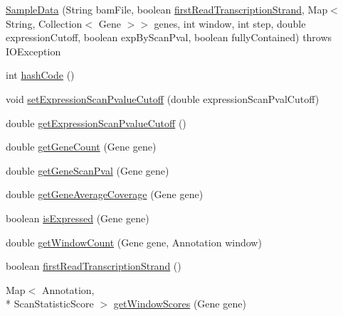 \begin{DoxyCompactItemize}
\item 
\hyperlink{classbroad_1_1pda_1_1seq_1_1protection_1_1_sample_data_acbea9965c1d9f8b120e1510e326c5b96}{Sample\+Data} (String bam\+File, boolean \hyperlink{classbroad_1_1pda_1_1seq_1_1protection_1_1_sample_data_a1a603b2dd39ba9c8b54b3552a3053783}{first\+Read\+Transcription\+Strand}, Map$<$ String, Collection$<$ Gene $>$$>$ genes, int window, int step, double expression\+Cutoff, boolean exp\+By\+Scan\+Pval, boolean fully\+Contained)  throws I\+O\+Exception 
\item 
int \hyperlink{classbroad_1_1pda_1_1seq_1_1protection_1_1_sample_data_a8fe3a848dd59a9a072680c711fa86766}{hash\+Code} ()
\item 
void \hyperlink{classbroad_1_1pda_1_1seq_1_1protection_1_1_sample_data_a2013287af35974ad48c4cd57b099ac4b}{set\+Expression\+Scan\+Pvalue\+Cutoff} (double expression\+Scan\+Pval\+Cutoff)
\item 
double \hyperlink{classbroad_1_1pda_1_1seq_1_1protection_1_1_sample_data_a4087ee5f33ea5ecc977f4fdf4483804e}{get\+Expression\+Scan\+Pvalue\+Cutoff} ()
\item 
double \hyperlink{classbroad_1_1pda_1_1seq_1_1protection_1_1_sample_data_aa2bf68f6d49af41a18f1d4a1277c36f4}{get\+Gene\+Count} (Gene gene)
\item 
double \hyperlink{classbroad_1_1pda_1_1seq_1_1protection_1_1_sample_data_a0795b41a9a096104df31f5b6ba2c9154}{get\+Gene\+Scan\+Pval} (Gene gene)
\item 
double \hyperlink{classbroad_1_1pda_1_1seq_1_1protection_1_1_sample_data_a7d17b21cbf2a2368cc637a7debb8089e}{get\+Gene\+Average\+Coverage} (Gene gene)
\item 
boolean \hyperlink{classbroad_1_1pda_1_1seq_1_1protection_1_1_sample_data_af2a3f7b805b2fea8605b821b53f56958}{is\+Expressed} (Gene gene)
\item 
double \hyperlink{classbroad_1_1pda_1_1seq_1_1protection_1_1_sample_data_afd2283807ea84e0cc2da07c108f6ca98}{get\+Window\+Count} (Gene gene, Annotation window)
\item 
boolean \hyperlink{classbroad_1_1pda_1_1seq_1_1protection_1_1_sample_data_a1a603b2dd39ba9c8b54b3552a3053783}{first\+Read\+Transcription\+Strand} ()
\item 
Map$<$ Annotation, \\*
Scan\+Statistic\+Score $>$ \hyperlink{classbroad_1_1pda_1_1seq_1_1protection_1_1_sample_data_a1adf639ddb5cd1b53ab3ff48f9f74ea9}{get\+Window\+Scores} (Gene gene)
\item 
$$
\end{DoxyCompactItemize}

